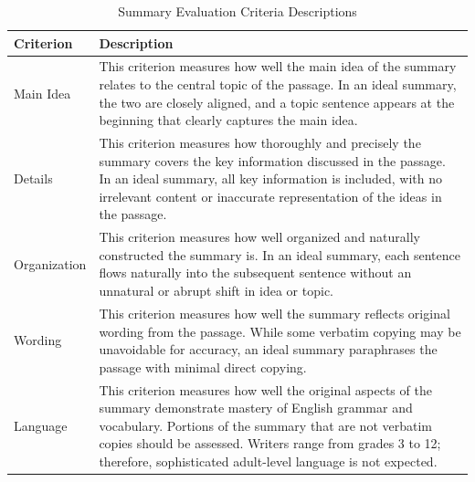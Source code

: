 \documentclass[11pt]{article}
\begin{document}

\begin{table}[!h]
\centering
\renewcommand{\arraystretch}{1.4}
\begin{tabular}{|p{3.5cm}|p{10cm}|}
\hline
\textbf{Criterion} & \textbf{Description} \\
\hline
Main Idea &
This criterion measures how well the main idea of the summary relates to the central topic of the passage. In an ideal summary, the two are closely aligned, and a topic sentence appears at the beginning that clearly captures the main idea. \\
\hline
Details &
This criterion measures how thoroughly and precisely the summary covers the key information discussed in the passage. In an ideal summary, all key information is included, with no irrelevant content or inaccurate representation of the ideas in the passage. \\
\hline
Organization &
This criterion measures how well organized and naturally constructed the summary is. In an ideal summary, each sentence flows naturally into the subsequent sentence without an unnatural or abrupt shift in idea or topic. \\
\hline
Wording &
This criterion measures how well the summary reflects original wording from the passage. While some verbatim copying may be unavoidable for accuracy, an ideal summary paraphrases the passage with minimal direct copying. \\
\hline
Language &
This criterion measures how well the original aspects of the summary demonstrate mastery of English grammar and vocabulary. Portions of the summary that are not verbatim copies should be assessed. Writers range from grades 3 to 12; therefore, sophisticated adult-level language is not expected. \\
\hline
\end{tabular}
\caption{Summary Evaluation Criteria Descriptions}
\label{apx:criteria}
\end{table}
\end{document}
